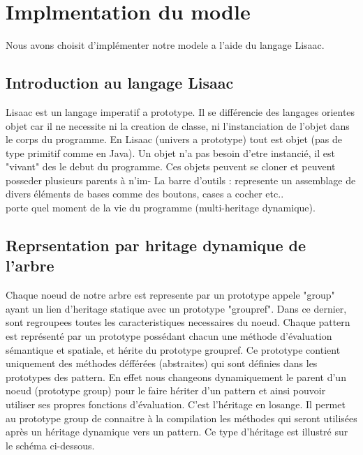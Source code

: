 \documentclass[fleqn]{article-hermes}
\begin{document}
\section{Implmentation du modle}

Nous avons choisit d'implémenter notre modele a l'aide du langage Lisaac.

\subsection{Introduction au langage Lisaac}

Lisaac est un langage imperatif a prototype. Il se différencie des langages orientes objet car il ne necessite
ni la creation de classe, ni l'instanciation de l'objet dans le corps du programme. En Lisaac (univers a prototype)
tout est objet (pas de type primitif comme en Java). Un objet n'a pas besoin d'etre instancié, il est "vivant" des le debut
du programme. Ces objets peuvent se cloner et peuvent posseder plusieurs parents à n'im- La barre d'outils : represente un assemblage de divers éléments de bases comme des boutons, cases a cocher etc..\\porte quel moment de la vie
du programme (multi-heritage dynamique).

\subsection{Reprsentation par hritage dynamique de l'arbre}

Chaque noeud de notre arbre est represente par un prototype appele "group" ayant un lien 
d'heritage statique avec un prototype "groupref". Dans ce dernier, sont regroupees toutes les caracteristiques
necessaires du noeud.
Chaque pattern est représenté par un prototype possédant chacun une méthode d'évaluation sémantique et spatiale, et hérite du prototype groupref. Ce prototype contient uniquement des méthodes défférées (abstraites) qui sont définies dans les prototypes des pattern. En effet nous changeons dynamiquement le parent d'un noeud (prototype group) pour le faire hériter d'un pattern et ainsi pouvoir utiliser ses propres fonctions d'évaluation. C'est l'héritage en losange. Il permet au prototype group de connaitre à la compilation les méthodes qui seront utilisées après un héritage dynamique vers un pattern.
Ce type d'héritage est illustré sur le schéma ci-dessous.
\end{document}
